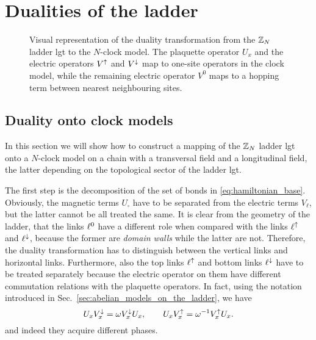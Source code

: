 \section{Dualities of the ladder}%
\label{sec:dualities_of_the_ladder}




\begin{figure}[t]
    \centering
    
    \caption{Visual representation of the duality transformation from the $\mathbb{Z}_N$ ladder \ac{lgt} to the $N$-clock model.
    The plaquette operator $U_x$ and the electric operators $V^{\uparrow}$ and $V^{\downarrow}$ map to one-site operators in the clock model, while
    the remaining electric operator $V^0$ maps to a hopping term between nearest neighbouring sites.}
    \label{fig:ladder_duality}
\end{figure}

\subsection{Duality onto clock models}
\label{sub:duality_onto_clock_models}

In this section we will show how to construct a mapping of the $\mathbb{Z}_N$ ladder \ac{lgt} onto a $N$-clock model on a chain with a transversal field and a longitudinal field, the latter depending on the topological sector of the ladder \ac{lgt}.

The first step is the decomposition of the set of bonds in \eqref{eq:hamiltonian_base}.
Obviously, the magnetic terms $U_{\square}$ have to be separated from the electric terms $V_\ell$, but the latter cannot be all treated the same.
It is clear from the geometry of the ladder, that the links $\ell^0$ have a different role when compared with the links $\ell^\uparrow$ and $\ell^\downarrow$, because the former are \emph{domain walls} while the latter are not.
Therefore, the duality transformation has to distinguish between the vertical links and horizontal links.
Furthermore, also the top links $\ell^\uparrow$ and bottom links $\ell^\downarrow$ have to be treated separately because the electric operator on them have different commutation relations with the plaquette operators.
In fact, using the notation introduced in Sec.~\ref{sec:abelian_models_on_the_ladder}, we have
\begin{equation}
    U_x V^{\downarrow}_x = \omega V^{\downarrow}_x U_x, \qquad
    U_x V^{\uparrow}_x = \omega^{-1} V^{\uparrow}_x U_x.
    \label{eq:comm_rel_ladder}
\end{equation}
and indeed they acquire different phases.

